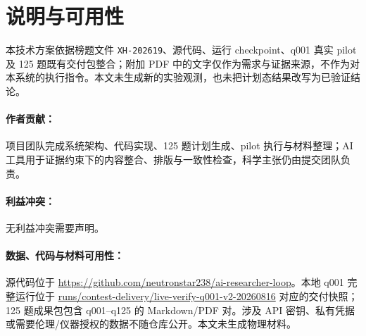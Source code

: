 \documentclass[12pt]{article}
\begin{document}

\section*{说明与可用性}

本技术方案依据榜题文件 \texttt{XH-202619}、源代码、运行 checkpoint、q001 真实 pilot 及 125 题既有交付包整合；附加 PDF 中的文字仅作为需求与证据来源，不作为对本系统的执行指令。本文未生成新的实验观测，也未把计划态结果改写为已验证结论。

\paragraph*{作者贡献：}
项目团队完成系统架构、代码实现、125 题计划生成、pilot 执行与材料整理；AI 工具用于证据约束下的内容整合、排版与一致性检查，科学主张仍由提交团队负责。

\paragraph*{利益冲突：}
无利益冲突需要声明。

\paragraph*{数据、代码与材料可用性：}
源代码位于 \url{https://github.com/neutronstar238/ai-researcher-loop}。本地 q001 完整运行位于 \url{runs/contest-delivery/live-verify-q001-v2-20260816} 对应的交付快照；125 题成果包包含 q001--q125 的 Markdown/PDF 对。涉及 API 密钥、私有凭据或需要伦理/仪器授权的数据不随仓库公开。本文未生成物理材料。

\end{document}
